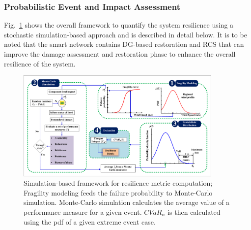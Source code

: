 \subsubsection{Probabilistic Event and Impact Assessment}
Fig.~\ref{fig:ysys} shows the overall framework to quantify the system resilience using a stochastic simulation-based approach and is described in detail below. It is to be noted that the smart network contains DG-based restoration and RCS that can improve the damage assessment and restoration phase to enhance the overall resilience of the system.   
\begin{figure}[t]
    \centering
    \includegraphics[width=0.9\textwidth,trim={0.5cm 0.25cm 0.35cm 0.5cm}, clip] {figures/MCS.pdf}
    \vspace{-0.2 cm}
    \caption{Simulation-based framework for resilience metric computation; Fragility modeling feeds the failure probability to Monte-Carlo simulation. Monte-Carlo simulation calculates the average value of a performance measure for a given event. $CVaR_\alpha$ is then calculated using the pdf of a given extreme event case.}
    \label{fig:ysys}
    \vspace{-0.3 cm}
\end{figure}


